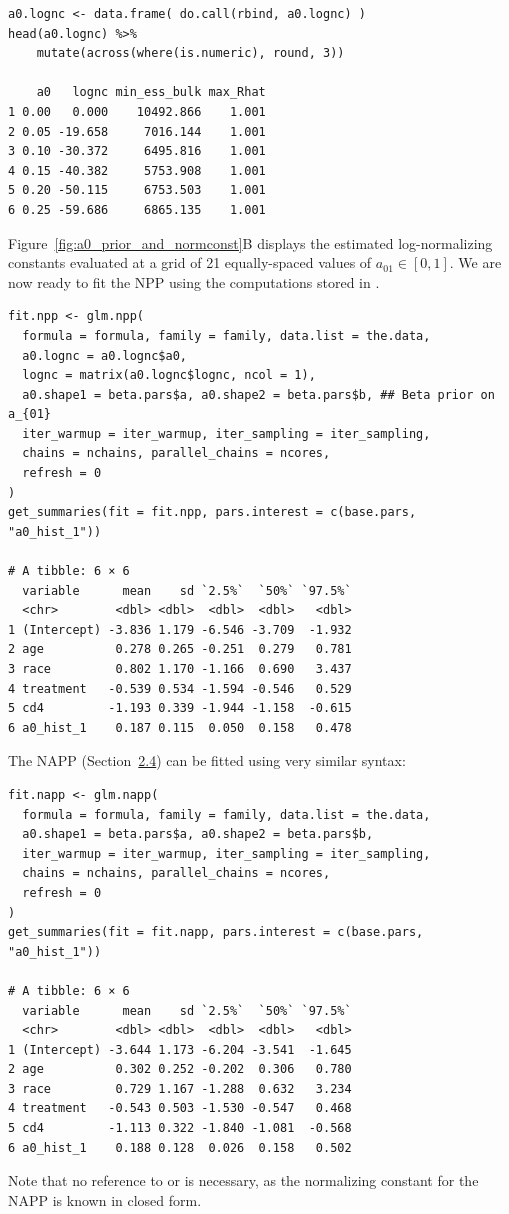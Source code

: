 \begin{verbatim}
a0.lognc <- data.frame( do.call(rbind, a0.lognc) )
head(a0.lognc) %>%
    mutate(across(where(is.numeric), round, 3))

    a0   lognc min_ess_bulk max_Rhat
1 0.00   0.000    10492.866    1.001
2 0.05 -19.658     7016.144    1.001
3 0.10 -30.372     6495.816    1.001
4 0.15 -40.382     5753.908    1.001
5 0.20 -50.115     6753.503    1.001
6 0.25 -59.686     6865.135    1.001

\end{verbatim}
Figure~\ref{fig:a0_prior_and_normconst}B displays the estimated log-normalizing constants evaluated at a grid of 21 equally-spaced values of $a_{01} \in [0, 1]$. We are now ready to fit the NPP using the computations stored in .
\begin{verbatim}
fit.npp <- glm.npp(
  formula = formula, family = family, data.list = the.data,
  a0.lognc = a0.lognc$a0,
  lognc = matrix(a0.lognc$lognc, ncol = 1),
  a0.shape1 = beta.pars$a, a0.shape2 = beta.pars$b, ## Beta prior on a_{01}
  iter_warmup = iter_warmup, iter_sampling = iter_sampling,
  chains = nchains, parallel_chains = ncores,
  refresh = 0
)
get_summaries(fit = fit.npp, pars.interest = c(base.pars, "a0_hist_1"))

# A tibble: 6 × 6
  variable      mean    sd `2.5%`  `50%` `97.5%`
  <chr>        <dbl> <dbl>  <dbl>  <dbl>   <dbl>
1 (Intercept) -3.836 1.179 -6.546 -3.709  -1.932
2 age          0.278 0.265 -0.251  0.279   0.781
3 race         0.802 1.170 -1.166  0.690   3.437
4 treatment   -0.539 0.534 -1.594 -0.546   0.529
5 cd4         -1.193 0.339 -1.944 -1.158  -0.615
6 a0_hist_1    0.187 0.115  0.050  0.158   0.478  
\end{verbatim}
The NAPP (Section~\hyperref[sec:napp]{2.4}) can be fitted using very similar syntax:
\begin{verbatim}
fit.napp <- glm.napp(
  formula = formula, family = family, data.list = the.data,
  a0.shape1 = beta.pars$a, a0.shape2 = beta.pars$b,
  iter_warmup = iter_warmup, iter_sampling = iter_sampling,
  chains = nchains, parallel_chains = ncores,
  refresh = 0
)
get_summaries(fit = fit.napp, pars.interest = c(base.pars, "a0_hist_1"))

# A tibble: 6 × 6
  variable      mean    sd `2.5%`  `50%` `97.5%`
  <chr>        <dbl> <dbl>  <dbl>  <dbl>   <dbl>
1 (Intercept) -3.644 1.173 -6.204 -3.541  -1.645
2 age          0.302 0.252 -0.202  0.306   0.780
3 race         0.729 1.167 -1.288  0.632   3.234
4 treatment   -0.543 0.503 -1.530 -0.547   0.468
5 cd4         -1.113 0.322 -1.840 -1.081  -0.568
6 a0_hist_1    0.188 0.128  0.026  0.158   0.502
\end{verbatim}
Note that no reference to  or  is necessary, as the normalizing constant for the NAPP is known in closed form. 

